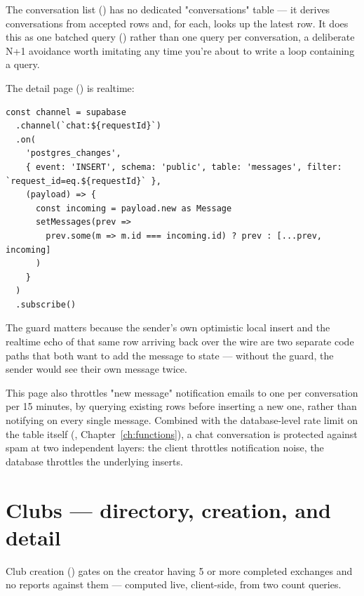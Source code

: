 The conversation list () has no dedicated "conversations" table — it derives conversations from accepted  rows and, for each, looks up the latest  row. It does this as one batched query () rather than one query per conversation, a deliberate N+1 avoidance worth imitating any time you're about to write a loop containing a query.

The detail page () is realtime:

\begin{lstlisting}[caption={app/(dashboard)/messages/[id]/page.tsx — realtime subscription with de-duplication}]
const channel = supabase
  .channel(`chat:${requestId}`)
  .on(
    'postgres_changes',
    { event: 'INSERT', schema: 'public', table: 'messages', filter: `request_id=eq.${requestId}` },
    (payload) => {
      const incoming = payload.new as Message
      setMessages(prev =>
        prev.some(m => m.id === incoming.id) ? prev : [...prev, incoming]
      )
    }
  )
  .subscribe()
\end{lstlisting}

The  guard matters because the sender's own optimistic local insert and the realtime echo of that same row arriving back over the wire are two separate code paths that both want to add the message to state — without the guard, the sender would see their own message twice.

\begin{olknote}
This page also throttles "new message" notification emails to one per conversation per 15 minutes, by querying existing  rows before inserting a new one, rather than notifying on every single message. Combined with the database-level rate limit on the  table itself (, Chapter~\ref{ch:functions}), a chat conversation is protected against spam at two independent layers: the client throttles notification noise, the database throttles the underlying inserts.
\end{olknote}

\section{Clubs — directory, creation, and detail}

Club creation () gates on the creator having 5 or more completed exchanges and no reports against them — computed live, client-side, from two count queries.

